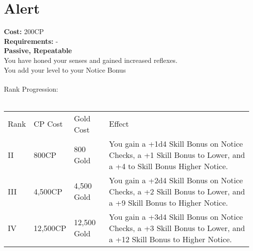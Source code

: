 \section{Alert}\label{perk:alert}
\textbf{Cost:} 200CP\\
\textbf{Requirements:} -\\
\textbf{Passive, Repeatable}\\
You have honed your senses and gained increased reflexes.\\
You add your level to your Notice Bonus\\
\\
Rank Progression:\\
\\
\begin{tabular}{l | l | l | l}
	Rank & CP Cost & Gold Cost & Effect\\
	II & 800CP & 800 Gold & You gain a +1d4 Skill Bonus on Notice Checks, a +1 Skill Bonus to Lower, and a +4 to Skill Bonus Higher Notice.\\
	III & 4,500CP & 4,500 Gold & You gain a +2d4 Skill Bonus on Notice Checks, a +2 Skill Bonus to Lower, and a +9 Skill Bonus to Higher Notice.\\
	IV & 12,500CP & 12,500 Gold & You gain a +3d4 Skill Bonus on Notice Checks, a +3 Skill Bonus to Lower, and a +12 Skill Bonus to Higher Notice.\\
\end{tabular}
